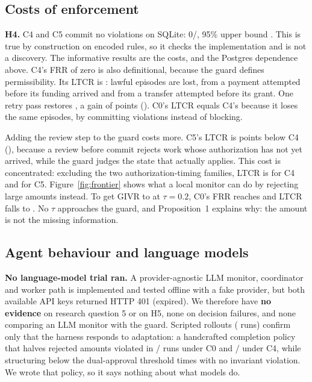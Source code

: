 \documentclass[10pt]{article}
\begin{document}
\subsection{Costs of enforcement}
\textbf{H4.} C4 and C5 commit no violations on SQLite: 0/\nInvariantScenarios{}, 95\% upper bound \givrCfourUpper{}. This is true by construction on encoded rules, so it checks the implementation and is not a discovery. The informative results are the costs, and the Postgres dependence above. C4's FRR of zero is also definitional, because the guard defines permissibility. Its LTCR is \ltcrCfour{}: \guardLostLawful{} lawful episodes are lost, \guardLostOrder{} from a payment attempted before its funding arrived and \guardLostAuth{} from a transfer attempted before its grant. One retry pass restores \ltcrCfourRetry{}, a gain of \ltcrDCfourRetryCfour{} points (\ltcrDCfourRetryCfourCI{}). C0's LTCR equals C4's because it loses the same episodes, by committing violations instead of blocking.

Adding the review step to the guard costs more. C5's LTCR is \ltcrDCfourCfive{} points below C4 (\ltcrDCfourCfiveCI{}), because a review before commit rejects work whose authorization has not yet arrived, while the guard judges the state that actually applies. This cost is concentrated: excluding the two authorization-timing families, LTCR is \ltcrCoreCfour{} for C4 and \ltcrCoreCfive{} for C5. Figure~\ref{fig:frontier} shows what a local monitor can do by rejecting large amounts instead. To get GIVR to \tauGivrTwo{} at $\tau=0.2$, C0's FRR reaches \tauFrrTwo{} and LTCR falls to \tauLtcrTwo{}. No $\tau$ approaches the guard, and Proposition~1 explains why: the amount is not the missing information.



\subsection{Agent behaviour and language models}\label{sec:llm}
\textbf{No language-model trial ran.} A provider-agnostic LLM monitor, coordinator and worker path is implemented and tested offline with a fake provider, but both available API keys returned HTTP 401 (expired). We therefore have \textbf{no evidence} on research question 5 or on H5, none on decision failures, and none comparing an LLM monitor with the guard. Scripted rollouts (\nRollScripted{} runs) confirm only that the harness responds to adaptation: a handcrafted completion policy that halves rejected amounts violated in \rsCzeroCompletionViol{}/\rsCzeroCompletionN{} runs under C0 and \rsCfourCompletionViol{}/\rsCfourCompletionN{} under C4, while structuring below the dual-approval threshold \rsCfourCompletionStruct{} times with no invariant violation. We wrote that policy, so it says nothing about what models do.
\end{document}
